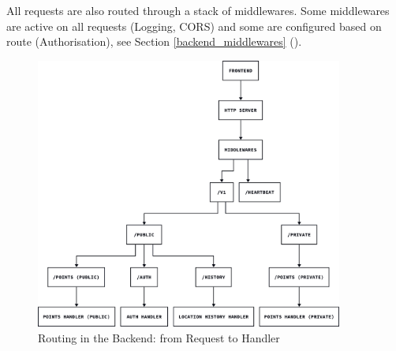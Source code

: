 All requests are also routed through a stack of middlewares. Some middlewares
are active on all requests (Logging, CORS) and some are configured based on
route (Authorisation), see Section \ref{backend_middlewares}
().

\begin{figure}[htbp]
  \centering{}
  \includegraphics[width=0.9\textwidth]{../d2-diagrams/backend-routing/backend-routing.png}
  \caption{Routing in the Backend: from Request to Handler}
  \label{fig:backend_routing}
\end{figure}

